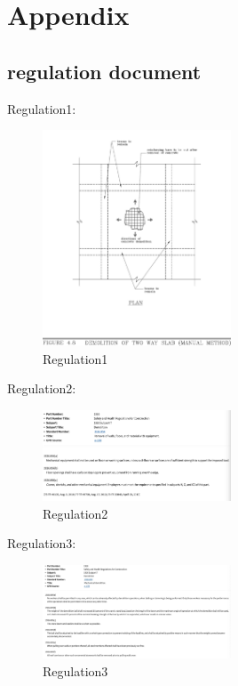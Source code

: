 \section*{Appendix}
\subsection{regulation document}
\label{sec:appendix}

\label{sec:regulation_document}
Regulation1: 
\begin{figure}
    \centering
    \includegraphics[width=0.5\textwidth]{figures/Demolition-of-Two-way-slab.jpeg}
    \caption{Regulation1}
    \label{fig:regulation1}
\end{figure}
Regulation2: 
\begin{figure}
    \centering
    \includegraphics[width=0.5\textwidth]{figures/Removal-of-walls-floors-and-material-with-equipment.png}
    \caption{Regulation2}
    \label{fig:regulation2}
\end{figure}
Regulation3: 
\begin{figure}
    \centering
    \includegraphics[width=0.5\textwidth]{figures/mechanical-demolition.jpeg}
    \caption{Regulation3}
    \label{fig:regulation3}
\end{figure}
